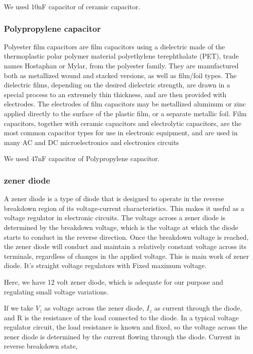 \documentclass[14pt,a4paper]{extarticle}
\begin{document}
We used 10nF capacitor of ceramic capacitor.
\subsubsection{Polypropylene capacitor}
\label{sec:org3ed50fb}
Polyester film capacitors are film capacitors using a dielectric made of the thermoplastic polar polymer material polyethylene terephthalate (PET), trade names Hostaphan or Mylar, from the polyester family. They are manufactured both as metallized wound and stacked versions, as well as film/foil types. The dielectric films, depending on the desired dielectric strength, are drawn in a special process to an extremely thin thickness, and are then provided with electrodes. The electrodes of film capacitors may be metallized aluminum or zinc applied directly to the surface of the plastic film, or a separate metallic foil. Film capacitors, together with ceramic capacitors and electrolytic capacitors, are the most common capacitor types for use in electronic equipment, and are used in many AC and DC microelectronics and electronics circuits

We used 47nF capacitor of Polypropylene capacitor.
\subsubsection{zener diode}
\label{sec:org3593f11}

A zener diode is a type of diode that is designed to operate in the reverse breakdown region of its voltage-current characteristics. This makes it useful as a voltage regulator in electronic circuits. The voltage across a zener diode is determined by the breakdown voltage, which is the voltage at which the diode starts to conduct in the reverse direction. Once the breakdown voltage is reached, the zener diode will conduct and maintain a relatively constant voltage across its terminals, regardless of changes in the applied voltage. This is main work of zener diode. It's straight voltage regulators with Fixed maximum voltage.

Here, we have 12 volt zener diode, which is adequate for our purpose and regulating small voltage variations.

If we take \(V_z\) as voltage across the zener diode, \(I_z\) as current through the diode, and R is the resistance of the load connected to the diode. In a typical voltage regulator circuit, the load resistance is known and fixed, so the voltage across the zener diode is determined by the current flowing through the diode. Current in reverse breakdown state,
\end{document}
